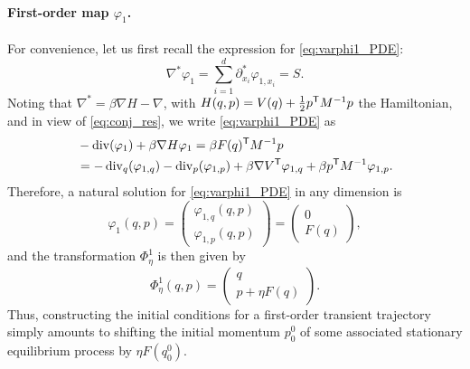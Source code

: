 \paragraph{First-order map $\varphi_1$.} For convenience, let us first recall the expression for \eqref{eq:varphi1_PDE}:
%
\begin{equation}
	\nabla^*\varphi_1 = \sum_{i=1}^d \partial_{x_i}^* \varphi_{1,x_i} = S. %
\end{equation}
%
Noting that $\nabla^* = \beta\nabla H - \nabla$, with $H(q,p) = V(q) + \frac{1}{2}p^\mathsf T M^{-1}p$ the Hamiltonian, and in view of \eqref{eq:conj_res}, we write \eqref{eq:varphi1_PDE} as 
%
%
\begin{align}
	&-\operatorname{div}(\varphi_1) + \beta\nabla H\varphi_1 = \beta F(q)^\mathsf T M^{-1} p \\
	&= -\operatorname{div}_q(\varphi_{1,q}) - \operatorname{div}_p(\varphi_{1,p}) + \beta \nabla V^\mathsf T \varphi_{1,q} + \beta p^\mathsf T M^{-1} \varphi_{1,p}.
\end{align}
%
Therefore, a natural solution for \eqref{eq:varphi1_PDE} in any dimension is
%
\begin{equation}
	\varphi_1(q,p) = \begin{pmatrix}
 	\varphi_{1,q}(q,p) \\ \varphi_{1,p}(q,p)
 	\end{pmatrix} =
	\begin{pmatrix}
 	0 \\ F(q)
 	\end{pmatrix},
 	\label{eq:varphi1_sol}
\end{equation}
%
and the transformation $\Phi^1_\eta$ is then given by
%
\begin{equation}
	\Phi_\eta^1(q,p) = 
	\begin{pmatrix}
 	  q \\ p + \eta F(q)
 	\end{pmatrix}.
\end{equation}
%
Thus, constructing the initial conditions for a first-order transient trajectory simply amounts to shifting the initial momentum $p_0^0$ of some associated stationary equilibrium process by $\eta F(q_0^0)$.

